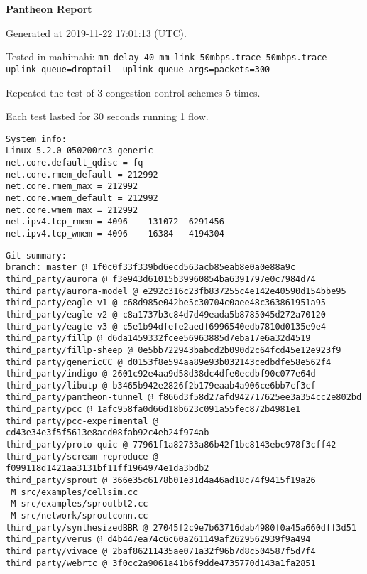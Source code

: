 \documentclass{article}
\begin{document}
\centerline{\textbf{\large{Pantheon Report}}}
\vspace{20pt}

Generated at 2019-11-22 17:01:13 (UTC).

Tested in mahimahi: \texttt{mm-delay 40 mm-link 50mbps.trace 50mbps.trace --uplink-queue=droptail --uplink-queue-args=packets=300}

Repeated the test of 3 congestion control schemes 5 times.

Each test lasted for 30 seconds running 1 flow.

\begin{verbatim}
System info:
Linux 5.2.0-050200rc3-generic
net.core.default_qdisc = fq
net.core.rmem_default = 212992
net.core.rmem_max = 212992
net.core.wmem_default = 212992
net.core.wmem_max = 212992
net.ipv4.tcp_rmem = 4096	131072	6291456
net.ipv4.tcp_wmem = 4096	16384	4194304
\end{verbatim}

\begin{verbatim}
Git summary:
branch: master @ 1f0c0f33f339bd6ecd563acb85eab8e0a0e88a9c
third_party/aurora @ f3e943d61015b39960854ba6391797e0c7984d74
third_party/aurora-model @ e292c316c23fb837255c4e142e40590d154bbe95
third_party/eagle-v1 @ c68d985e042be5c30704c0aee48c363861951a95
third_party/eagle-v2 @ c8a1737b3c84d7d49eada5b8785045d272a70120
third_party/eagle-v3 @ c5e1b94dfefe2aedf6996540edb7810d0135e9e4
third_party/fillp @ d6da1459332fcee56963885d7eba17e6a32d4519
third_party/fillp-sheep @ 0e5bb722943babcd2b090d2c64fcd45e12e923f9
third_party/genericCC @ d0153f8e594aa89e93b032143cedbdfe58e562f4
third_party/indigo @ 2601c92e4aa9d58d38dc4dfe0ecdbf90c077e64d
third_party/libutp @ b3465b942e2826f2b179eaab4a906ce6bb7cf3cf
third_party/pantheon-tunnel @ f866d3f58d27afd942717625ee3a354cc2e802bd
third_party/pcc @ 1afc958fa0d66d18b623c091a55fec872b4981e1
third_party/pcc-experimental @ cd43e34e3f5f5613e8acd08fab92c4eb24f974ab
third_party/proto-quic @ 77961f1a82733a86b42f1bc8143ebc978f3cff42
third_party/scream-reproduce @ f099118d1421aa3131bf11ff1964974e1da3bdb2
third_party/sprout @ 366e35c6178b01e31d4a46ad18c74f9415f19a26
 M src/examples/cellsim.cc
 M src/examples/sproutbt2.cc
 M src/network/sproutconn.cc
third_party/synthesizedBBR @ 27045f2c9e7b63716dab4980f0a45a660dff3d51
third_party/verus @ d4b447ea74c6c60a261149af2629562939f9a494
third_party/vivace @ 2baf86211435ae071a32f96b7d8c504587f5d7f4
third_party/webrtc @ 3f0cc2a9061a41b6f9dde4735770d143a1fa2851
\end{verbatim}
\end{document}
